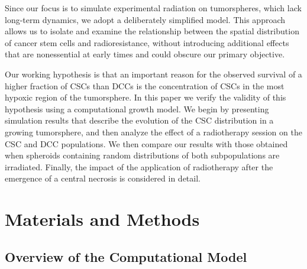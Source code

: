 \documentclass[10pt,letterpaper]{article}
\begin{document}
Since our focus is to simulate experimental radiation on tumorspheres, which lack  long-term dynamics, we adopt a deliberately simplified model. This approach allows us to isolate and examine the relationship between the spatial distribution of cancer stem cells and radioresistance, without introducing additional effects that are nonessential at early times and could obscure our primary objective. 

Our working hypothesis is that an important reason for the observed survival of a higher fraction of CSCs than DCCs is the concentration of CSCs in the most hypoxic region of the tumorsphere. In this paper we verify the validity of this hypothesis using a computational growth model. We begin by presenting simulation results that describe the evolution of the CSC distribution in a growing tumorsphere, and then analyze the effect of a radiotherapy session on the CSC and DCC populations. We then compare our results with those obtained when spheroids containing random distributions of both subpopulations are irradiated. Finally, the impact of the application of radiotherapy after the emergence of a central necrosis is considered in detail.


\section*{Materials and Methods} \label{section: methods}

\subsection*{Overview of the Computational Model}
\end{document}
